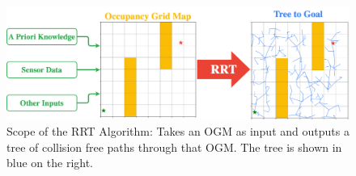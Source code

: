 
\begin{figure}[H]
\begin{centering}
\includegraphics[width=\linewidth]{chapters/chapter2/img/RRT-Scope.png}
\caption[Scope of the RRT Algorithm]{Scope of the RRT Algorithm: Takes an \gls{OGM} as input and outputs a tree of collision free paths through that \gls{OGM}. The tree is shown in blue on the right.} 
\label{fig:rrt_scope}
\end{centering}
\end{figure}